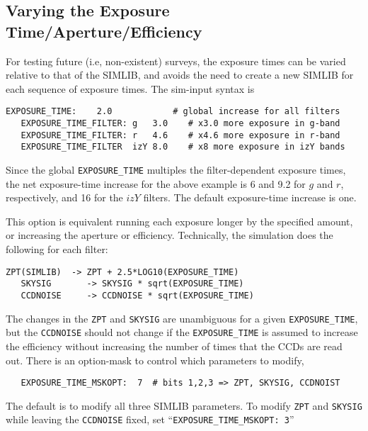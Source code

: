 \documentclass[12pt]{article}
\newcommand{\eff}{efficiency}
\begin{document}
{%


   \clearpage
   \subsection{Varying the Exposure Time/Aperture/Efficiency}
   \label{subsec:exposure_time}

For testing future (i.e, non-existent) surveys,
the exposure times can be varied relative to that of the SIMLIB,
and avoids the need to create a new SIMLIB for each sequence
of exposure times.  The sim-input syntax is
%
\begin{Verbatim}[frame=single]
   EXPOSURE_TIME:    2.0            # global increase for all filters
   EXPOSURE_TIME_FILTER: g   3.0    # x3.0 more exposure in g-band
   EXPOSURE_TIME_FILTER: r   4.6    # x4.6 more exposure in r-band
   EXPOSURE_TIME_FILTER  izY 8.0    # x8 more exposure in izY bands
\end{Verbatim}
%
Since the global {\tt EXPOSURE\_TIME} multiples the
filter-dependent exposure times, the net exposure-time
increase for the above example is 6 and 9.2 for $g$ and $r$, 
respectively, and 16 for the $izY$ filters.
The default exposure-time increase is one.

This option is equivalent running each exposure longer
by the specified amount, or increasing the aperture or efficiency.
Technically, the simulation does the following
for each filter:
%
\begin{Verbatim}[frame=single]
   ZPT(SIMLIB)  -> ZPT + 2.5*LOG10(EXPOSURE_TIME)
   SKYSIG       -> SKYSIG * sqrt(EXPOSURE_TIME)
   CCDNOISE     -> CCDNOISE * sqrt(EXPOSURE_TIME)
\end{Verbatim}
%
The changes in the {\tt ZPT} and {\tt SKYSIG} are unambiguous
for a given {\tt EXPOSURE\_TIME}, but the {\tt CCDNOISE}
should not change if the {\tt EXPOSURE\_TIME} is assumed
to increase the efficiency without increasing the number
of times that the CCDs are read out. There is an option-mask
to control which parameters to modify,
\begin{verbatim}
   EXPOSURE_TIME_MSKOPT:  7  # bits 1,2,3 => ZPT, SKYSIG, CCDNOIST
\end{verbatim}
The default is to modify all three SIMLIB parameters.
To modify {\tt ZPT} and {\tt SKYSIG} while leaving
the {\tt CCDNOISE} fixed, set ``{\tt EXPOSURE\_TIME\_MSKOPT: 3}''


}
\end{document}
